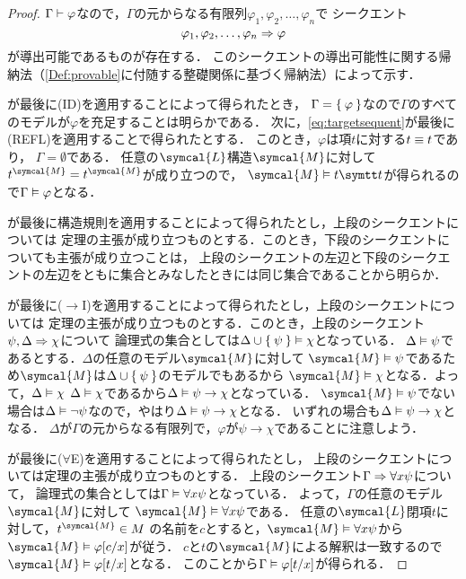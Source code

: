 \begin{proof}
	\(\Gamma \vdash \varphi\)なので，\(\Gamma\)の元からなる有限列\(\varphi_1, \varphi_2, \dots, \varphi_n\)で
	シークエント
	\begin{equation}
		\varphi_1, \varphi_2, \dots, \varphi_n \Rightarrow \varphi
		\label{eq:targetsequent}
	\end{equation}
	が導出可能であるものが存在する．
	このシークエントの導出可能性に関する帰納法（\cref{Def:provable}に付随する整礎関係に基づく帰納法）によって示す．

	が最後に(ID)を適用することによって得られたとき，
	\(\Gamma = \Set{\varphi}\)なので\(\Gamma\)のすべてのモデルが\(\varphi\)を充足することは明らかである．
	次に，\cref{eq:targetsequent}が最後に(REFL)を適用することで得られたとする．
	このとき，\(\varphi\)は項\(t\)に対する\(t \equiv t\)であり，
	\(\Gamma = \emptyset\)である．
	任意の\(\symcal{L}\)構造\(\symcal{M}\)に対して
	\(\interpretation{\symcal{M}}{t} = \interpretation{\symcal{M}}{t}\)が成り立つので，
	\(\symcal{M} \satisfy t \obj t\)が得られるので\(\Gamma \vDash \varphi\)となる．

	が最後に構造規則を適用することによって得られたとし，上段のシークエントについては
	定理の主張が成り立つものとする．このとき，下段のシークエントについても主張が成り立つことは，
	上段のシークエントの左辺と下段のシークエントの左辺をともに集合とみなしたときには同じ集合であることから明らか．

	が最後に(\(\to\)I)を適用することによって得られたとし，上段のシークエントについては
	定理の主張が成り立つものとする．このとき，上段のシークエント\(\psi, \Delta \Rightarrow \chi\)について
	論理式の集合としては\(\Delta \cup \Set{\psi} \vDash \chi\)となっている．
	\(\Delta \vDash \psi\)であるとする．\(\Delta\)の任意のモデル\(\symcal{M}\)に対して
	\(\symcal{M} \satisfy \psi\)であるため\(\symcal{M}\)は\(\Delta \cup \Set{\psi}\)のモデルでもあるから
	\(\symcal{M} \satisfy \chi\)となる．よって，\(\Delta \vDash \chi\)
	\(\Delta \vDash \chi\)であるから\(\Delta \vDash \psi \to \chi\)となっている．
	\(\symcal{M} \satisfy \psi\)でない場合は\(\Delta \vDash \lnot \psi\)なので，やはり\(\Delta \vDash \psi \to \chi\)となる．
	いずれの場合も\(\Delta \vDash \psi \to \chi\)となる．
	\(\Delta\)が\(\Gamma\)の元からなる有限列で，\(\varphi\)が\(\psi \to \chi\)であることに注意しよう．

	が最後に(\(\forall\)E)を適用することによって得られたとし，
	上段のシークエントについては定理の主張が成り立つものとする．
	上段のシークエント\(\Gamma \Rightarrow \forall x \psi\)について，
	論理式の集合としては\(\Gamma \vDash \forall x \psi\)となっている．
	よって，\(\Gamma\)の任意のモデル\(\symcal{M}\)に対して
	\(\symcal{M} \satisfy \forall x \psi\)である．
	任意の\(\symcal{L}\)閉項\(t\)に対して，\(\interpretation{\symcal{M}}{t} \in M\)
	の名前を\(c\)とすると，\(\symcal{M} \satisfy \forall x \psi\)から
	\(\symcal{M} \satisfy \subst{\varphi}{c/x}\)が従う．
	\(c\)と\(t\)の\(\symcal{M}\)による解釈は一致するので
	\(\symcal{M} \satisfy \subst{\varphi}{t/x}\)となる．
	このことから\(\Gamma \satisfy \subst{\varphi}{t/x}\)が得られる．


\end{proof}
